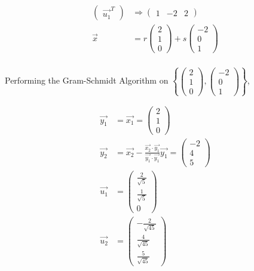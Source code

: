 \begin{align}
    \begin{pmatrix}
        \Vec{u_1}^T
    \end{pmatrix} &\Rightarrow \begin{pmatrix}
        1 & -2 & 2
    \end{pmatrix}  \\ 
    \Vec{x} &= r \begin{pmatrix}
        2 \\ 1 \\ 0
    \end{pmatrix} + s \begin{pmatrix}
        -2 \\ 0 \\ 1
    \end{pmatrix} \\
\end{align}

\noindent
Performing the Gram-Schmidt Algorithm on \(\left\{ \begin{pmatrix}
    2 \\ 1 \\ 0
\end{pmatrix}, \begin{pmatrix}
    -2 \\ 0 \\ 1
\end{pmatrix}\right\}\),

\begin{align}
    \Vec{y_1} &= \Vec{x_1} = \begin{pmatrix}
        2 \\ 1 \\ 0
    \end{pmatrix} \\
    \Vec{y_2} &= \Vec{x_2} - \frac{\Vec{x_2} \cdot \Vec{y_1}}{\Vec{y_1} \cdot \Vec{y_1}} \Vec{y_1} = \begin{pmatrix}
        -2 \\ 4 \\ 5
    \end{pmatrix} \\
    \Vec{u_1} &= \begin{pmatrix}
        \frac{2}{\sqrt{5}} \\ \frac{1}{\sqrt{5}} \\ 0
    \end{pmatrix} \\
    \Vec{u_2} &= \begin{pmatrix}
        -\frac{2}{\sqrt{45}} \\ \frac{4}{\sqrt{45}} \\ \frac{5}{\sqrt{45}}
    \end{pmatrix}
\end{align}

